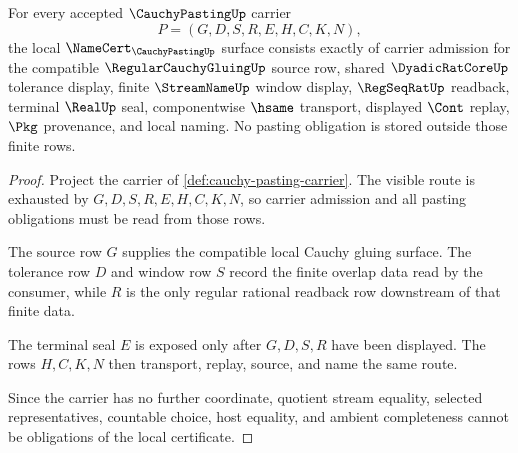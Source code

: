 \begin{theorem}
\label{thm:cauchy-pasting-namecert-obligations}
For every accepted $\CauchyPastingUp$ carrier
$$
P=(G,D,S,R,E,H,C,K,N),
$$
the local $\NameCert_{\CauchyPastingUp}$ surface consists exactly of carrier admission for the compatible $\RegularCauchyGluingUp$ source row, shared $\DyadicRatCoreUp$ tolerance display, finite $\StreamNameUp$ window display, $\RegSeqRatUp$ readback, terminal $\RealUp$ seal, componentwise $\hsame$ transport, displayed $\Cont$ replay, $\Pkg$ provenance, and local naming. No pasting obligation is stored outside those finite rows.
\end{theorem}
\begin{proof}
Project the carrier of \autoref{def:cauchy-pasting-carrier}. The visible route is exhausted by $G,D,S,R,E,H,C,K,N$, so carrier admission and all pasting obligations must be read from those rows.

The source row $G$ supplies the compatible local Cauchy gluing surface. The tolerance row $D$ and window row $S$ record the finite overlap data read by the consumer, while $R$ is the only regular rational readback row downstream of that finite data.

The terminal seal $E$ is exposed only after $G,D,S,R$ have been displayed. The rows $H,C,K,N$ then transport, replay, source, and name the same route.

Since the carrier has no further coordinate, quotient stream equality, selected representatives, countable choice, host equality, and ambient completeness cannot be obligations of the local certificate.
\end{proof}

